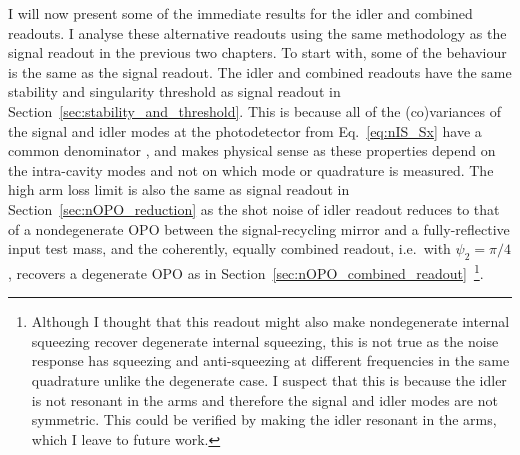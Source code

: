 I will now present some of the immediate results for the idler and combined readouts. %
I analyse these alternative readouts using the same methodology as the signal readout in the previous two chapters. 
To start with, some of the behaviour is the same as the signal readout. 
The idler and combined readouts have the same stability and singularity threshold as signal readout in Section~\ref{sec:stability_and_threshold}. This is because all of the (co)variances of the signal and idler modes at the photodetector from Eq.~\ref{eq:nIS_Sx} have a common denominator , and makes physical sense as these properties depend on the intra-cavity modes and not on which mode or quadrature is measured.  
The high arm loss limit is also the same as signal readout in Section~\ref{sec:nOPO_reduction} as the shot noise of idler readout reduces to that of a nondegenerate OPO between the signal-recycling mirror and a fully-reflective input test mass, and the coherently, equally combined readout, i.e.\ with $\psi_2=\pi/4$, recovers a degenerate OPO  as in Section~\ref{sec:nOPO_combined_readout}~\footnote{Although I thought that this readout might also make nondegenerate internal squeezing recover degenerate internal squeezing, this is not true as the noise response has squeezing and anti-squeezing at different frequencies in the same quadrature unlike the degenerate case. I suspect that this is because the idler is not resonant in the arms and therefore the signal and idler modes are not symmetric. This could be verified by making the idler resonant in the arms, which I leave to future work.}.


